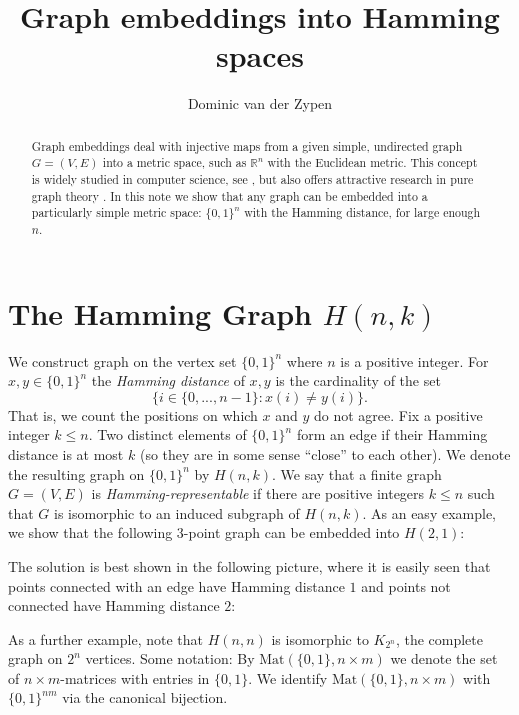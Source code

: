 \documentclass[12pt, a4paper]{amsart}
\begin{document}
\title{Graph embeddings into Hamming spaces}
\author{Dominic van der Zypen}
\address{Swiss Armed Forces, CH-3003 Bern, Switzerland}
\begin{abstract}
Graph embeddings deal with injective maps from a given 
simple, undirected graph $G=(V,E)$ into a metric space, such as $\mathbb{R}^n$ with the Euclidean metric. This concept is widely studied in computer science, see \cite{ge1}, but also offers attractive research in pure graph theory \cite{ge2}. In this note
we show that any graph can be embedded into a particularly simple metric space: $\{0,1\}^n$ with the Hamming distance, for large enough $n$.
\end{abstract}
\maketitle
\section{The Hamming Graph $H(n,k)$}
We construct graph on the vertex set $\{0,1\}^n$ where $n$ is a positive integer. For $x,y \in \{0,1\}^n$ the {\it Hamming distance} of $x,y$ is the cardinality of the set $$\big\{ i \in \{0, ..., n-1\} : x(i) \neq y(i)\big\}.$$ That is, we count the positions on which $x$ and $y$ do not agree.
Fix a positive integer $k \leq n$. Two distinct elements of $\{0,1\}^n$ form an edge if their Hamming distance is at most $k$ (so they are in some sense ``close'' to each other). We denote the resulting graph on $\{0,1\}^n$ by $H(n,k)$.
We say that a finite graph $G=(V,E)$ is {\it Hamming-representable} if there are positive integers $k\leq n$ such that $G$ is isomorphic to an induced subgraph of $H(n,k)$.
As an easy example, we show that the following $3$-point graph can be embedded into $H(2,1)$:
\begin{center}
\end{center}
The solution is best shown in the following picture, where it is easily seen that points connected with an edge have Hamming distance $1$ and points not connected have Hamming distance $2$:
\begin{center}
\end{center}
As a further example, note that $H(n,n)$ is isomorphic to $K_{2^n}$, the complete graph on $2^n$ vertices.
Some notation: By $\mathrm{Mat}(\{0,1\}, n\times m)$ we denote the set of $n\times m$-matrices with entries in $\{0,1\}$. We identify $\mathrm{Mat}(\{0,1\}, n\times m)$ with $\{0,1\}^{nm}$ via the canonical bijection.
\end{document}
